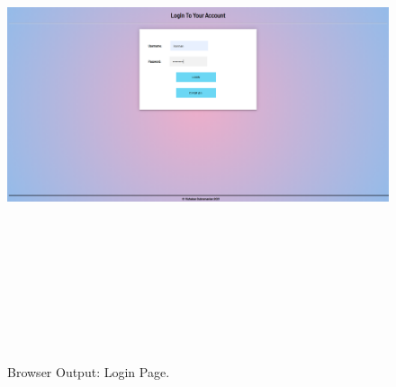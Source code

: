 \documentclass[12pt, a4]{article}
\begin{document}
\newpage
\subsection*{}
\begin{flushleft}

\end{flushleft}

\newpage
\subsection*{}
\begin{figure}[h]
\centering
\caption{Browser Output: Login Page.}
\includegraphics[height=15cm, width=18cm]{Output/Login.png}
\end{figure}

\newpage
\end{document}
